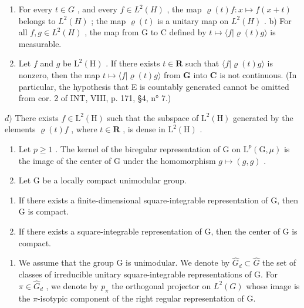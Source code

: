 \begin{enumerate}
\def\labelenumi{\alph{enumi})}
\item
  For every \(t \in G\) , and every \(f \in L^{2}(H)\) , the map \(\varrho(t)f: x \mapsto f(x + t)\) belongs to \(L^{2}(H)\) ; the map \(\varrho(t)\) is a unitary map on \(L^{2}(H)\) . b) For all \(f,g \in L^{2}(H)\) , the map from G to C defined by \(t \mapsto \langle f | \varrho(t)g \rangle\) is measurable.
\item
  Let \(f\) and \(g\) be \(\mathrm{L}^2(\mathrm{H})\) . If there exists \(t \in \mathbf{R}\) such that \(\langle f | \varrho(t)g \rangle\) is nonzero, then the map \(t \mapsto \langle f | \varrho(t)g \rangle\) from \(\mathbf{G}\) into \(\mathbf{C}\) is not continuous. (In particular, the hypothesis that E is countably generated cannot be omitted from cor. 2 of INT, VIII, p. 171, §4, n° 7.)
\end{enumerate}

\(d)\) There exists \(f \in \mathrm{L}^2(\mathrm{H})\) such that the subspace of \(\mathrm{L}^2(\mathrm{H})\) generated by the elements \(\varrho(t)f\) , where \(t \in \mathbf{R}\) , is dense in \(\mathrm{L}^2(\mathrm{H})\) .

\begin{enumerate}
\def\labelenumi{\arabic{enumi})}
\setcounter{enumi}{3}
\item
  Let \(p \geqslant 1\) . The kernel of the biregular representation of G on \(\mathrm{L}^{p}(\mathrm{G}, \mu)\) is the image of the center of G under the homomorphism \(g \mapsto (g, g)\) .
\item
  Let G be a locally compact unimodular group.
\end{enumerate}

\begin{enumerate}
\def\labelenumi{\alph{enumi})}
\item
  If there exists a finite-dimensional square-integrable representation of G, then G is compact.
\item
  If there exists a square-integrable representation of G, then the center of G is compact.
\end{enumerate}

\begin{enumerate}
\def\labelenumi{\arabic{enumi})}
\setcounter{enumi}{5}
\tightlist
\item
  We assume that the group G is unimodular. We denote by \(\widehat{G}_{d} \subset \widehat{G}\) the set of classes of irreducible unitary square-integrable representations of G. For \(\pi \in \widehat{G}_{d}\) , we denote by \(p_{\pi}\) the orthogonal projector on \(L^{2}(G)\) whose image is the \(\pi\)-isotypic component of the right regular representation of G.
\end{enumerate}

